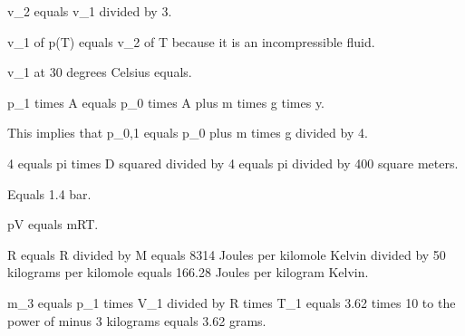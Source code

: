 v_2 equals v_1 divided by 3.

v_1 of p(T) equals v_2 of T because it is an incompressible fluid.

v_1 at 30 degrees Celsius equals.

p_1 times A equals p_0 times A plus m times g times y.

This implies that p_0,1 equals p_0 plus m times g divided by 4.

4 equals pi times D squared divided by 4 equals pi divided by 400 square meters.

Equals 1.4 bar.

pV equals mRT.

R equals R divided by M equals 8314 Joules per kilomole Kelvin divided by 50 kilograms per kilomole equals 166.28 Joules per kilogram Kelvin.

m_3 equals p_1 times V_1 divided by R times T_1 equals 3.62 times 10 to the power of minus 3 kilograms equals 3.62 grams.